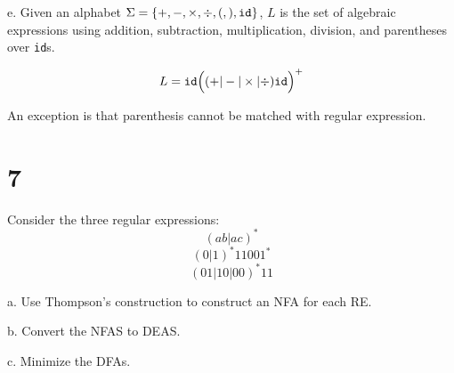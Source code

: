 \documentclass[11pt]{article}
\begin{document}
e. Given an alphabet $\Sigma = \{+, -, \times, \div, (,), \verb|id|\}$, $L$ is the set of algebraic expressions using addition, subtraction, multiplication, division, and parentheses over \verb|id|s.

\begin{Answer}
$$L = \verb|id|\Big((+ | - | \times | \div)\verb|id|\Big)^+$$

An exception is that parenthesis cannot be matched with regular expression.
\end{Answer}

\newpage

\section*{7}
Consider the three regular expressions:
$$(ab | ac)^*$$
$$(0 | 1)^* 1100 1^*$$
$$(01 | 10 | 00)^* 11$$

a. Use Thompson's construction to construct an NFA for each RE. 

\begin{Answer}
\end{Answer}

b. Convert the NFAS to DEAS.

\begin{Answer}
\end{Answer}

c. Minimize the DFAs.

\begin{Answer}
\end{Answer}
\end{document}
